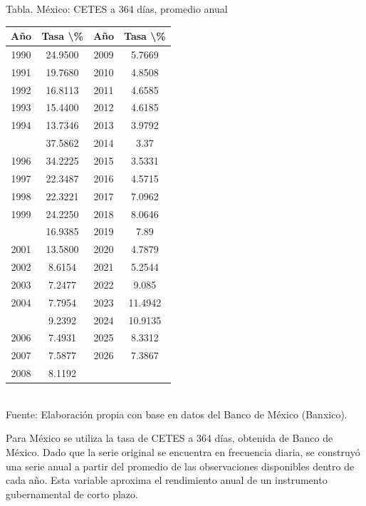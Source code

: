 \documentclass{article}\usepackage[]{graphicx}\usepackage[]{xcolor}
\begin{document}
\begin{center}
Tabla. México: CETES a 364 días, promedio anual
\end{center}
\begin{center}

\begin{tabular}{cccc}
\toprule
Año & Tasa \textbackslash{}\% & Año & Tasa \textbackslash{}\%\\
\midrule
1990 & 24.9500 & 2009 & 5.7669\\
1991 & 19.7680 & 2010 & 4.8508\\
1992 & 16.8113 & 2011 & 4.6585\\
1993 & 15.4400 & 2012 & 4.6185\\
1994 & 13.7346 & 2013 & 3.9792\\
\addlinespace
1995 & 37.5862 & 2014 & 3.37\\
1996 & 34.2225 & 2015 & 3.5331\\
1997 & 22.3487 & 2016 & 4.5715\\
1998 & 22.3221 & 2017 & 7.0962\\
1999 & 24.2250 & 2018 & 8.0646\\
\addlinespace
2000 & 16.9385 & 2019 & 7.89\\
2001 & 13.5800 & 2020 & 4.7879\\
2002 & 8.6154 & 2021 & 5.2544\\
2003 & 7.2477 & 2022 & 9.085\\
2004 & 7.7954 & 2023 & 11.4942\\
\addlinespace
2005 & 9.2392 & 2024 & 10.9135\\
2006 & 7.4931 & 2025 & 8.3312\\
2007 & 7.5877 & 2026 & 7.3867\\
2008 & 8.1192 &  & \\
\bottomrule
\end{tabular}
\\[0.3em]
{\footnotesize Fuente: Elaboración propia con base en datos del Banco de México (Banxico).}
\end{center}


Para México se utiliza la tasa de CETES a 364 días, obtenida de Banco de México. Dado que la serie original se encuentra en frecuencia diaria, se construyó una serie anual a partir del promedio de las observaciones disponibles dentro de cada año. Esta variable aproxima el rendimiento anual de un instrumento gubernamental de corto plazo.
\end{document}
